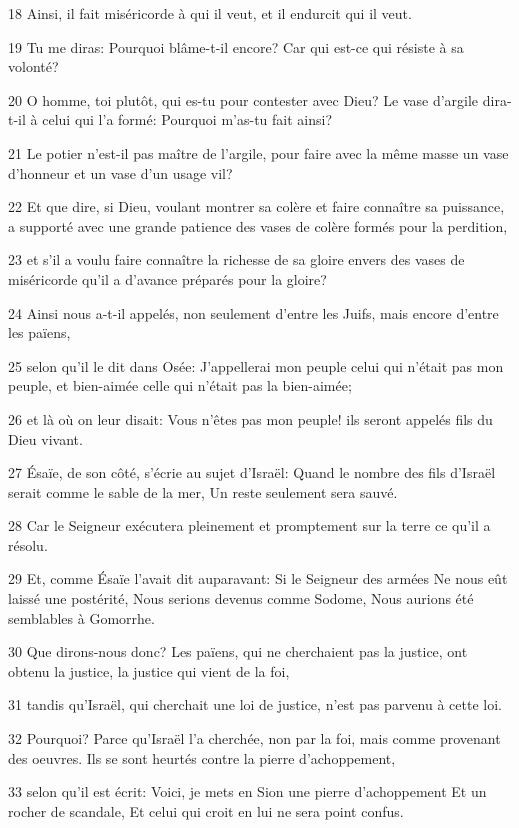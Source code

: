 \par 18 Ainsi, il fait miséricorde à qui il veut, et il endurcit qui il veut.
\par 19 Tu me diras: Pourquoi blâme-t-il encore? Car qui est-ce qui résiste à sa volonté?
\par 20 O homme, toi plutôt, qui es-tu pour contester avec Dieu? Le vase d'argile dira-t-il à celui qui l'a formé: Pourquoi m'as-tu fait ainsi?
\par 21 Le potier n'est-il pas maître de l'argile, pour faire avec la même masse un vase d'honneur et un vase d'un usage vil?
\par 22 Et que dire, si Dieu, voulant montrer sa colère et faire connaître sa puissance, a supporté avec une grande patience des vases de colère formés pour la perdition,
\par 23 et s'il a voulu faire connaître la richesse de sa gloire envers des vases de miséricorde qu'il a d'avance préparés pour la gloire?
\par 24 Ainsi nous a-t-il appelés, non seulement d'entre les Juifs, mais encore d'entre les païens,
\par 25 selon qu'il le dit dans Osée: J'appellerai mon peuple celui qui n'était pas mon peuple, et bien-aimée celle qui n'était pas la bien-aimée;
\par 26 et là où on leur disait: Vous n'êtes pas mon peuple! ils seront appelés fils du Dieu vivant.
\par 27 Ésaïe, de son côté, s'écrie au sujet d'Israël: Quand le nombre des fils d'Israël serait comme le sable de la mer, Un reste seulement sera sauvé.
\par 28 Car le Seigneur exécutera pleinement et promptement sur la terre ce qu'il a résolu.
\par 29 Et, comme Ésaïe l'avait dit auparavant: Si le Seigneur des armées Ne nous eût laissé une postérité, Nous serions devenus comme Sodome, Nous aurions été semblables à Gomorrhe.
\par 30 Que dirons-nous donc? Les païens, qui ne cherchaient pas la justice, ont obtenu la justice, la justice qui vient de la foi,
\par 31 tandis qu'Israël, qui cherchait une loi de justice, n'est pas parvenu à cette loi.
\par 32 Pourquoi? Parce qu'Israël l'a cherchée, non par la foi, mais comme provenant des oeuvres. Ils se sont heurtés contre la pierre d'achoppement,
\par 33 selon qu'il est écrit: Voici, je mets en Sion une pierre d'achoppement Et un rocher de scandale, Et celui qui croit en lui ne sera point confus.

